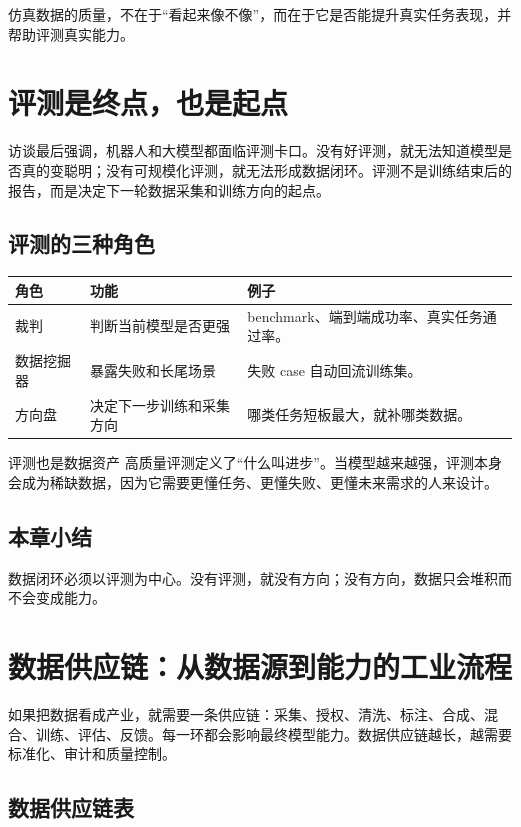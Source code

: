 \documentclass[a4paper]{article}
\begin{document}
仿真数据的质量，不在于“看起来像不像”，而在于它是否能提升真实任务表现，并帮助评测真实能力。

\section{评测是终点，也是起点}

访谈最后强调，机器人和大模型都面临评测卡口。没有好评测，就无法知道模型是否真的变聪明；没有可规模化评测，就无法形成数据闭环。评测不是训练结束后的报告，而是决定下一轮数据采集和训练方向的起点。

\subsection{评测的三种角色}

\noindent\begin{longtable}{p{}p{}p{}}
\toprule
角色 & 功能 & 例子 \\
\midrule
裁判 & 判断当前模型是否更强 & benchmark、端到端成功率、真实任务通过率。 \\
数据挖掘器 & 暴露失败和长尾场景 & 失败 case 自动回流训练集。 \\
方向盘 & 决定下一步训练和采集方向 & 哪类任务短板最大，就补哪类数据。 \\
\bottomrule
\end{longtable}

\begin{importantbox}{评测也是数据资产}
高质量评测定义了“什么叫进步”。当模型越来越强，评测本身会成为稀缺数据，因为它需要更懂任务、更懂失败、更懂未来需求的人来设计。
\end{importantbox}

\subsection{本章小结}

数据闭环必须以评测为中心。没有评测，就没有方向；没有方向，数据只会堆积而不会变成能力。

\section{数据供应链：从数据源到能力的工业流程}

如果把数据看成产业，就需要一条供应链：采集、授权、清洗、标注、合成、混合、训练、评估、反馈。每一环都会影响最终模型能力。数据供应链越长，越需要标准化、审计和质量控制。

\subsection{数据供应链表}
\end{document}
